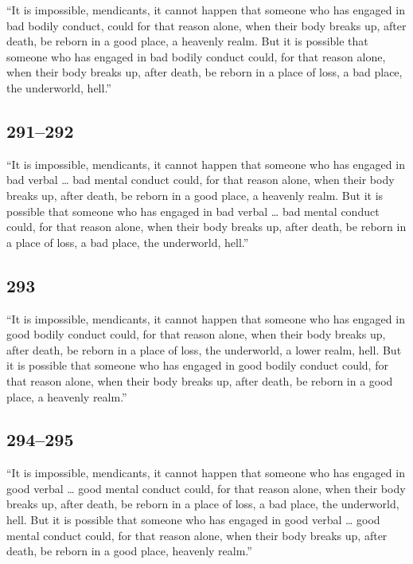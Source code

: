 \documentclass[12pt,openany]{book}%
\begin{document}
“It is impossible, mendicants, it cannot happen that someone who has engaged in bad bodily conduct, could for that reason alone, when their body breaks up, after death, be reborn in a good place, a heavenly realm. But it is possible that someone who has engaged in bad bodily conduct could, for that reason alone, when their body breaks up, after death, be reborn in a place of loss, a bad place, the underworld, hell.” 

\subsection*{291–292 }

“It is impossible, mendicants, it cannot happen that someone who has engaged in bad verbal … bad mental conduct could, for that reason alone, when their body breaks up, after death, be reborn in a good place, a heavenly realm. But it is possible that someone who has engaged in bad verbal … bad mental conduct could, for that reason alone, when their body breaks up, after death, be reborn in a place of loss, a bad place, the underworld, hell.” 

\subsection*{293 }

“It is impossible, mendicants, it cannot happen that someone who has engaged in good bodily conduct could, for that reason alone, when their body breaks up, after death, be reborn in a place of loss, the underworld, a lower realm, hell. But it is possible that someone who has engaged in good bodily conduct could, for that reason alone, when their body breaks up, after death, be reborn in a good place, a heavenly realm.” 

\subsection*{294–295 }

“It is impossible, mendicants, it cannot happen that someone who has engaged in good verbal … good mental conduct could, for that reason alone, when their body breaks up, after death, be reborn in a place of loss, a bad place, the underworld, hell. But it is possible that someone who has engaged in good verbal … good mental conduct could, for that reason alone, when their body breaks up, after death, be reborn in a good place, heavenly realm.” 
\end{document}
